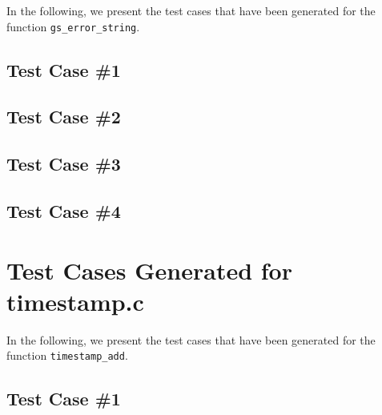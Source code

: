 In the following, we present the test cases that have been generated for the function \texttt{gs\_error\_string}.

\subsection{Test Case \#1}


\subsection{Test Case \#2}


\subsection{Test Case \#3}


\subsection{Test Case \#4}




\newpage
\section{Test Cases Generated for timestamp.c}

In the following, we present the test cases that have been generated for the function \texttt{timestamp\_add}.

\subsection{Test Case \#1}


